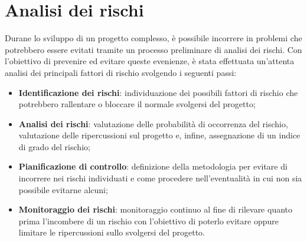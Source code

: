\documentclass[../piano-di-progetto.tex]{subfiles}
\begin{document}
\section{Analisi dei rischi}
Durane lo sviluppo di un progetto complesso, è possibile incorrere in problemi che potrebbero essere evitati tramite un processo preliminare di analisi dei rischi. Con l'obiettivo di prevenire ed evitare queste evenienze, è stata effettuata un'attenta analisi dei principali fattori di rischio svolgendo i seguenti passi:

\begin{itemize}
    \item \textbf{Identificazione dei rischi}: individuazione dei possibili fattori di rischio che potrebbero rallentare o bloccare il normale svolgersi del progetto;
    \item \textbf{Analisi dei rischi}: valutazione delle probabilità di occorrenza del rischio, valutazione delle ripercussioni sul progetto e, infine, assegnazione di un indice di grado del rischio;
    \item \textbf{Pianificazione di controllo}: definizione della metodologia per evitare di incorrere nei rischi individuati e come procedere nell'eventualità in cui non sia possibile evitarne alcuni;
    \item \textbf{Monitoraggio dei rischi}: monitoraggio continuo al fine di rilevare quanto prima l'incombere di un rischio con l'obiettivo di poterlo evitare oppure limitare le ripercussioni sullo svolgersi del progetto.
\end{itemize}
\end{document}

